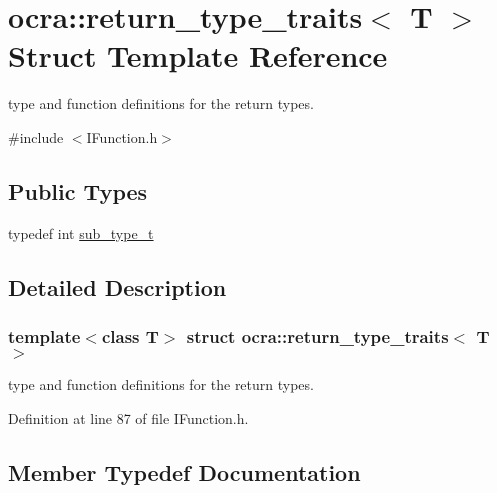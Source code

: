 \hypertarget{structocra_1_1return__type__traits}{}\section{ocra\+:\+:return\+\_\+type\+\_\+traits$<$ T $>$ Struct Template Reference}
\label{structocra_1_1return__type__traits}


type and function definitions for the return types.  




{\ttfamily \#include $<$I\+Function.\+h$>$}

\subsection*{Public Types}
\begin{DoxyCompactItemize}
\item 
typedef int \hyperlink{structocra_1_1return__type__traits_a28ffd04e2ff6d8e8a186c1aeaa89d881}{sub\+\_\+type\+\_\+t}
\end{DoxyCompactItemize}


\subsection{Detailed Description}
\subsubsection*{template$<$class T$>$\newline
struct ocra\+::return\+\_\+type\+\_\+traits$<$ T $>$}

type and function definitions for the return types. 

Definition at line 87 of file I\+Function.\+h.



\subsection{Member Typedef Documentation}
\hypertarget{structocra_1_1return__type__traits_a28ffd04e2ff6d8e8a186c1aeaa89d881}{}\label{structocra_1_1return__type__traits_a28ffd04e2ff6d8e8a186c1aeaa89d881} 

